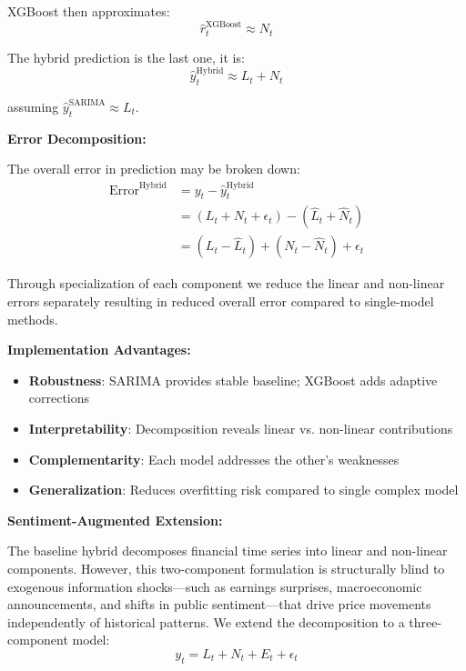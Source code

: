 XGBoost then approximates:
\begin{equation}
\hat{r}_t^{\text{XGBoost}} \approx N_t
\end{equation}

The hybrid prediction is the last one, it is:
\begin{equation}
\hat{y}_t^{\text{Hybrid}} \approx L_t + N_t
\end{equation}

assuming $\hat{y}_t^{\text{SARIMA}} \approx L_t$.

\textbf{Error Decomposition:}

The overall error in prediction may be broken down:
\begin{align}
\text{Error}^{\text{Hybrid}} &= y_t - \hat{y}_t^{\text{Hybrid}} \\
&= (L_t + N_t + \epsilon_t) - (\hat{L}_t + \hat{N}_t) \\
&= (L_t - \hat{L}_t) + (N_t - \hat{N}_t) + \epsilon_t
\end{align}

Through specialization of each component we reduce the linear and non-linear errors separately resulting in reduced overall error compared to single-model methods.

\textbf{Implementation Advantages:}
\begin{itemize}
    \item \textbf{Robustness}: SARIMA provides stable baseline; XGBoost adds adaptive corrections
    \item \textbf{Interpretability}: Decomposition reveals linear vs. non-linear contributions
    \item \textbf{Complementarity}: Each model addresses the other's weaknesses
    \item \textbf{Generalization}: Reduces overfitting risk compared to single complex model
\end{itemize}

\textbf{Sentiment-Augmented Extension:}

The baseline hybrid decomposes financial time series into linear and non-linear components. However, this two-component formulation is structurally blind to exogenous information shocks---such as earnings surprises, macroeconomic announcements, and shifts in public sentiment---that drive price movements independently of historical patterns. We extend the decomposition to a three-component model:
\begin{equation}
y_t = L_t + N_t + E_t + \epsilon_t
\end{equation}

